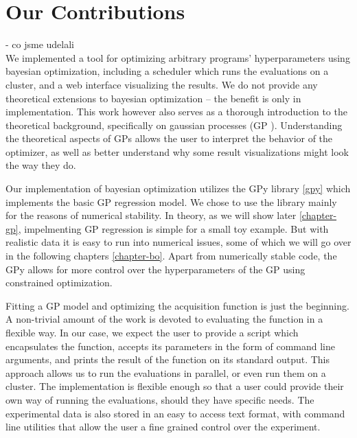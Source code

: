 




\section{Our Contributions}

- co jsme udelali
\\

We implemented a tool for optimizing arbitrary programs' hyperparameters using
bayesian optimization, including a scheduler which runs the evaluations on a
cluster, and a web interface visualizing the results. We do not provide any
theoretical extensions to bayesian optimization -- the benefit is only in
implementation. This work however also serves as a thorough introduction to the
theoretical background, specifically on gaussian processes (GP ). Understanding the theoretical aspects of GPs allows the
user to interpret the behavior of the optimizer, as well as better understand
why some result visualizations might look the way they do.

Our implementation of bayesian optimization utilizes the GPy library \ref{gpy}
which implements the basic GP regression model. We chose to use the library
mainly for the reasons of numerical stability. In theory, as we will show later
\ref{chapter-gp}, impelmenting GP regression is simple for a small toy example.
But with realistic data it is easy to run into numerical issues, some of which
we will go over in the following chapters \ref{chapter-bo}. Apart from
numerically stable code, the GPy allows for more control over the
hyperparameters of the GP using constrained optimization.

Fitting a GP model and optimizing the acquisition function is just the
beginning. A non-trivial amount of the work is devoted to evaluating the
function in a flexible way. In our case, we expect the user to provide a script
which encapsulates the function, accepts its parameters in the form of command
line arguments, and prints the result of the function on its standard output.
This approach allows us to run the evaluations in parallel, or even run them on
a cluster. The implementation is flexible enough so that a user could provide
their own way of running the evaluations, should they have specific needs.  The
experimental data is also stored in an easy to access text format, with command
line utilities that allow the user a fine grained control over the experiment.

